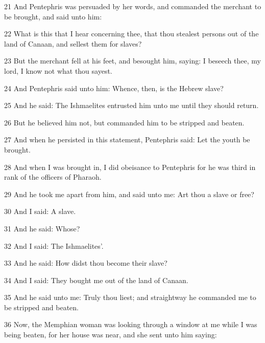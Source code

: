 \par 21 And Pentephris was persuaded by her words, and commanded the merchant to be brought, and said unto him:

\par 22 What is this that I hear concerning thee, that thou stealest persons out of the land of Canaan, and sellest them for slaves?

\par 23 But the merchant fell at his feet, and besought him, saying: I beseech thee, my lord, I know not what thou sayest.

\par 24 And Pentephris said unto him: Whence, then, is the Hebrew slave?

\par 25 And he said: The Ishmaelites entrusted him unto me until they should return.

\par 26 But he believed him not, but commanded him to be stripped and beaten.

\par 27 And when he persisted in this statement, Pentephris said: Let the youth be brought.

\par 28 And when I was brought in, I did obeisance to Pentephris for he was third in rank of the officers of Pharaoh.

\par 29 And he took me apart from him, and said unto me: Art thou a slave or free?

\par 30 And I said: A slave.

\par 31 And he said: Whose?

\par 32 And I said: The Ishmaelites'.

\par 33 And he said: How didst thou become their slave?

\par 34 And I said: They bought me out of the land of Canaan.

\par 35 And he said unto me: Truly thou liest; and straightway he commanded me to be stripped and beaten.

\par 36 Now, the Memphian woman was looking through a window at me while I was being beaten, for her house was near, and she sent unto him saying:

